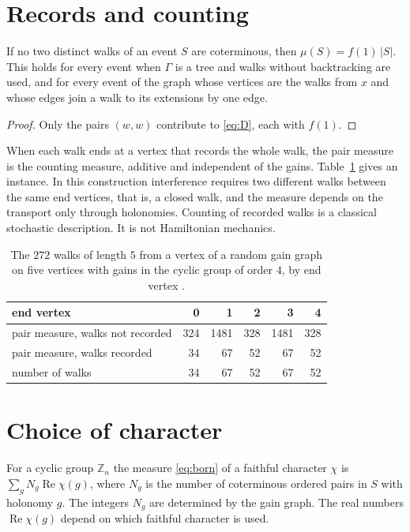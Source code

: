 \section{Records and counting}

\begin{proposition}\label{prop:records}
If no two distinct walks of an event $S$ are coterminous, then $\mu(S)=f(1)\,|S|$. This holds for every event when $\Gamma$ is a tree and walks without backtracking are used, and for every event of the graph whose vertices are the walks from $x$ and whose edges join a walk to its extensions by one edge.
\end{proposition}
\begin{proof}
Only the pairs $(w,w)$ contribute to \eqref{eq:D}, each with $f(1)$.
\end{proof}

When each walk ends at a vertex that records the whole walk, the pair measure is the counting measure, additive and independent of the gains. Table~\ref{tab:records} gives an instance. In this construction interference requires two different walks between the same end vertices, that is, a closed walk, and the measure depends on the transport only through holonomies. Counting of recorded walks is a classical stochastic description. It is not Hamiltonian mechanics.

\begin{table}[ht]\centering\small
\begin{tabular}{@{}lrrrrr@{}}\toprule
end vertex & 0 & 1 & 2 & 3 & 4\\\midrule
pair measure, walks not recorded & 324 & 1481 & 328 & 1481 & 328\\
pair measure, walks recorded & 34 & 67 & 52 & 67 & 52\\
number of walks & 34 & 67 & 52 & 67 & 52\\\bottomrule
\end{tabular}
\caption{The $272$ walks of length $5$ from a vertex of a random gain graph on five vertices with gains in the cyclic group of order $4$, by end vertex \cite{comp2}.}\label{tab:records}
\end{table}

\section{Choice of character}\label{sec:char}

For a cyclic group $\mathbb{Z}_n$ the measure \eqref{eq:born} of a faithful character $\chi$ is $\sum_{g}N_g\operatorname{Re}\chi(g)$, where $N_g$ is the number of coterminous ordered pairs in $S$ with holonomy $g$. The integers $N_g$ are determined by the gain graph. The real numbers $\operatorname{Re}\chi(g)$ depend on which faithful character is used.

